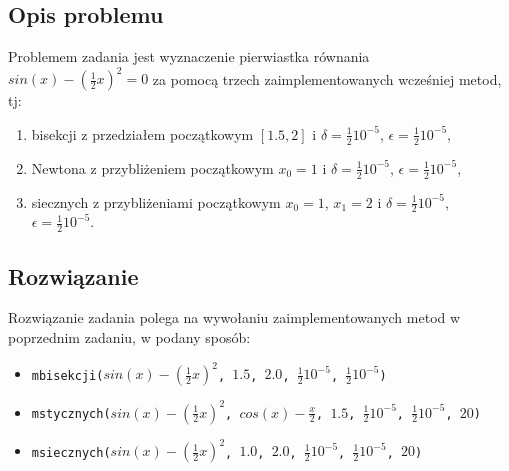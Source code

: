\documentclass{article}
\begin{document}
\subsection{Opis problemu}
Problemem zadania jest wyznaczenie pierwiastka równania $sin(x) - (\frac{1}{2}x)^2 = 0$ za pomocą trzech zaimplementowanych wcześniej metod, tj:
\begin{enumerate}
    \item bisekcji z przedziałem początkowym $[1.5, 2]$ i $\delta = \frac{1}{2}10^{-5}$, $\epsilon = \frac{1}{2}10^{-5}$,
    \item Newtona z przybliżeniem początkowym $x_0 = 1$ i $\delta = \frac{1}{2}10^{-5}$, $\epsilon = \frac{1}{2}10^{-5}$,
    \item siecznych z przybliżeniami początkowym $x_0 = 1$, $x_1 = 2$ i $\delta = \frac{1}{2}10^{-5}$, $\epsilon = \frac{1}{2}10^{-5}$.
\end{enumerate}
\subsection{Rozwiązanie}
Rozwiązanie zadania polega na wywołaniu zaimplementowanych metod w poprzednim zadaniu, w podany sposób:
\begin{itemize}
    \item \texttt{mbisekcji($sin(x) - (\frac{1}{2}x)^2$, $1.5$, $2.0$, $\frac{1}{2}10^{-5}$, $\frac{1}{2}10^{-5}$)}
    \item \texttt{mstycznych($sin(x) - (\frac{1}{2}x)^2$, $cos(x) - \frac{x}{2}$, $1.5$, $\frac{1}{2}10^{-5}$, $\frac{1}{2}10^{-5}$, $20$)}
    \item \texttt{msiecznych($sin(x) - (\frac{1}{2}x)^2$, $1.0$, $2.0$, $\frac{1}{2}10^{-5}$, $\frac{1}{2}10^{-5}$, $20$)}
\end{itemize}
\end{document}
